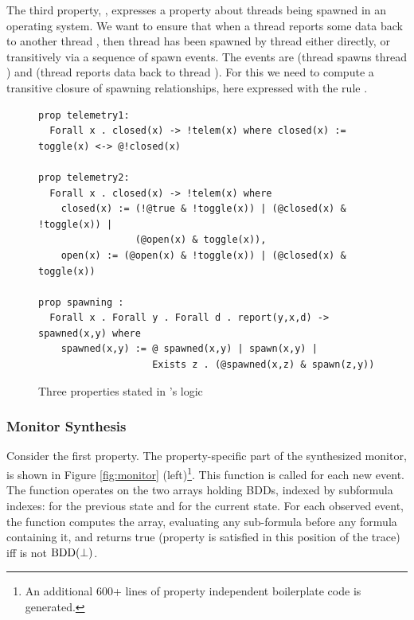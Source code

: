 The third property, , expresses a property
about threads being spawned in an operating system. We want to 
ensure that when a thread  reports some data  
back to another thread , then thread  has been spawned by thread  either directly, or transitively 
via a sequence of spawn events. The events are
 (thread  spawns thread )
and  (thread  reports data 
back to thread ).
For this we need to compute a transitive closure of spawning relationships, here expressed with the rule .

\begin{figure}
\begin{center}
\begin{lstlisting}[language=dsl,frame=single,linewidth=0.95\textwidth,backgroundcolor=\color{white},linewidth=\columnwidth,breaklines=true,basicstyle=\small]
prop telemetry1: 
  Forall x . closed(x) -> !telem(x) where closed(x) := toggle(x) <-> @!closed(x) 

prop telemetry2: 
  Forall x . closed(x) -> !telem(x) where
    closed(x) := (!@true & !toggle(x)) | (@closed(x) & !toggle(x)) | 
                 (@open(x) & toggle(x)),
    open(x) := (@open(x) & !toggle(x)) | (@closed(x) & toggle(x))

prop spawning :
  Forall x . Forall y . Forall d . report(y,x,d) -> spawned(x,y) where
    spawned(x,y) := @ spawned(x,y) | spawn(x,y) | 
                    Exists z . (@spawned(x,z) & spawn(z,y))
\end{lstlisting}
\caption{Three properties stated in \dejavu's logic}
\label{fig:properties}
\end{center}
\end{figure}


\iffalse
\subsubsection{Monitor Synthesis}

Consider the first  property. The property-specific 
part of the synthesized monitor, is shown 
in Figure \ref{fig:monitor} (left)\footnote{An additional 600+ lines of property independent 
boilerplate code is generated.}. This function is called for each new event. The function operates on the two arrays holding BDDs, indexed by subformula indexes:  for the previous state and  for the current state. For each observed event, the function  computes the  array, evaluating any sub-formula before any formula containing it,
and returns true (property is satisfied in this position of the trace)  iff  is not $\mathrm{BDD}(\bot)$. 

